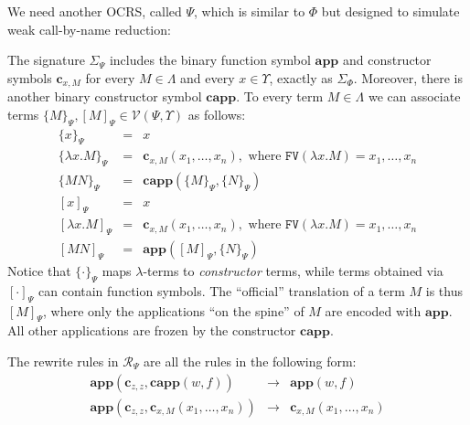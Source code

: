 \documentclass{LMCS}
\newcommand{\varone}{x}
\newcommand{\varthree}{z}
\newcommand{\varfour}{w}
\newcommand{\varfive}{f}
\newcommand{\lambdaone}{M}
\newcommand{\lambdatwo}{N}
\newcommand{\appTRS}{\mathbf{app}}
\newcommand{\cappTRSW}{\mathbf{capp}}
\newcommand{\constr}[2]{\mathbf{c}_{#1,#2}}
\newcommand{\LambdatoTRSW}[1]{[#1]_{\Psi}}
\newcommand{\LambdatoTRSWaux}[1]{\{#1\}_{\Psi}}
\newcommand{\Variables}{\Upsilon}
\newcommand{\Lambdaterms}{\Lambda}
\newcommand{\Functions}[1]{\Sigma_{#1}}
\newcommand{\Rules}[1]{\mathcal{R}_{#1}}
\newcommand{\TRS}{\Phi}
\newcommand{\TRSW}{\Psi}
\newcommand{\TRSWvarterms}{\mathcal{V}(\Psi,\Variables)}
\newcommand{\rewrTRSW}{\rightarrow}
\newcommand{\FV}[1]{\mathtt{FV}(#1)}
\newenvironment{varitemize}
{
\begin{list}{\labelitemi}
{\setlength{\itemsep}{0.0mm}
 \setlength{\topsep}{0.0mm}
 \setlength{\parindent}{0.0mm}
 \setlength{\parskip}{0.0mm}
 \setlength{\parsep}{0.0mm}
 \setlength{\partopsep}{0.0mm}
 \setlength{\leftmargin}{15pt}
 \setlength{\labelsep}{5pt}
 \setlength{\labelwidth}{10pt}}}
{
 \end{list} 
}
\begin{document}
We need another OCRS, called $\TRSW$, which is similar to $\TRS$ but designed
to simulate weak call-by-name reduction:
\begin{varitemize}
\item
  The signature $\Functions{\TRSW}$ includes the binary function symbol $\appTRS$ and
  constructor symbols $\constr{\varone}{M}$ for every $\lambdaone\in\Lambdaterms$ and
  every $\varone\in\Variables$, exactly as $\Functions{\TRS}$. Moreover, there is another
  binary constructor symbol $\cappTRSW$. 
  To every term $\lambdaone\in\Lambdaterms$ we can associate
  terms $\LambdatoTRSWaux{\lambdaone},\LambdatoTRSW{\lambdaone}\in\TRSWvarterms$ as follows:
  \begin{eqnarray*}
    \LambdatoTRSWaux{\varone}&=&\varone\\
    \LambdatoTRSWaux{\lambda\varone.\lambdaone}&=&\constr{\varone}{\lambdaone}(\varone_1,\ldots,\varone_{n}),
      \mbox{ where $\FV{\lambda\varone.\lambdaone}=\varone_1,\ldots,\varone_n$}\\
    \LambdatoTRSWaux{\lambdaone\lambdatwo}&=&\cappTRSW(\LambdatoTRSWaux{\lambdaone},\LambdatoTRSWaux{\lambdatwo})\\
    \LambdatoTRSW{\varone}&=&\varone\\
    \LambdatoTRSW{\lambda\varone.\lambdaone}&=&\constr{\varone}{\lambdaone}(\varone_1,\ldots,\varone_{n}),
      \mbox{ where $\FV{\lambda\varone.\lambdaone}=\varone_1,\ldots,\varone_n$}\\
    \LambdatoTRSW{\lambdaone\lambdatwo}&=&\appTRS(\LambdatoTRSW{\lambdaone},\LambdatoTRSWaux{\lambdatwo})
  \end{eqnarray*}
  Notice that $\LambdatoTRSWaux{\cdot}$ maps $\lambda$-terms to \emph{constructor} terms, while
  terms obtained via $\LambdatoTRSW{\cdot}$ can contain function symbols. The ``official'' translation of a term $M$ is thus $\LambdatoTRSW{M}$, where only the applications ``on the spine'' of $M$ are  encoded with $\appTRS$. All other applications are frozen by the constructor $\cappTRSW$.
\item
    The rewrite rules in $\Rules{\TRSW}$ are all the rules in the following form:
    \begin{eqnarray*}
      \appTRS(\constr{\varthree}{\varthree},\cappTRSW(\varfour,\varfive))&\rewrTRSW&\appTRS(\varfour,\varfive)\\
      \appTRS(\constr{\varthree}{\varthree},\constr{\varone}{\lambdaone}(\varone_1,\ldots,\varone_n))&\rewrTRSW&
        \constr{\varone}{\lambdaone}(\varone_1,\ldots,\varone_n)\\

\end{eqnarray*}
\end{varitemize}
\end{document}
